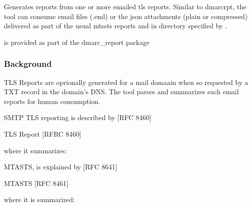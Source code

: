 \documentclass[letterpaper,10pt,english]{sphinxmanual}
\begin{document}
\sphinxAtStartPar
Generates reports from one or more emailed tls reports. Similar to
dmarc\sphinxhyphen{}rpt, the tool can consume email files (.eml) or the json attachments (plain or compressed)
delivered as part of the usual mts\sphinxhyphen{}sts reports \sphinxhyphen{} and in directory specified by .

\sphinxAtStartPar
{} is provided as part of the dmarc\_report package


\subsubsection{Background}
\label{\detokenize{Readme-TLS:background}}
\sphinxAtStartPar
TLS Reports are oprionally generated for a mail domaain when so requested by a TXT record in
the domain’s DNS. The tool parses and summarizes such email reports for human consumption.

\sphinxAtStartPar
SMTP TLS reporting is described by {[}RFC 8460{]} %
\begin{footnote}[1]\sphinxAtStartFootnote
TLS Report {[}RFRC 8460{]} 
%
\end{footnote} where it summarizes:

\begin{sphinxVerbatim}[commandchars=\\\{\}]
        
        
         
  
\end{sphinxVerbatim}

\sphinxAtStartPar
MTA\sphinxhyphen{}STS, is explained by {[}RFC 8641{]} %
\begin{footnote}[2]\sphinxAtStartFootnote
MTA\sphinxhyphen{}STS {[}RFC 8461{]} 
%
\end{footnote} where it is summarized:
\end{document}

